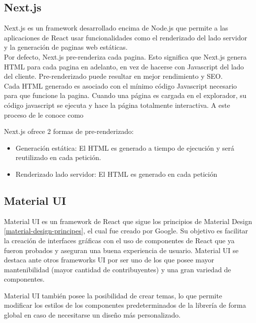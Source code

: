 \subsection{Next.js}

Next.js es un framework desarrollado encima de Node.js que permite a las aplicaciones de React usar funcionalidades como el renderizado del lado servidor y la generación de paginas web estáticas.\\

Por defecto, Next.js pre-renderiza cada pagina. Esto significa que Next.js genera HTML para cada pagina en adelanto, en vez de hacerse con Javascript del lado del cliente. Pre-renderizado puede resultar en mejor rendimiento y SEO.\\

Cada HTML generado es asociado con el mínimo código Javascript necesario para que funcione la pagina. Cuando una página es cargada en el explorador, su código javascript se ejecuta y hace la página totalmente interactiva. A este proceso de le conoce como 

Next.js ofrece 2 formas de pre-renderizado:

\begin{itemize}
    \item Generación estática: El HTML es generado a tiempo de ejecución y será reutilizado en cada petición.
    \item Renderizado lado servidor: El HTML es generado en cada petición
\end{itemize}

\subsection{Material UI}

Material UI es un framework de React que sigue los principios de Material Design \ref*{material-design-principes}, el cual fue creado por Google. Su objetivo es facilitar la creación de interfaces gráficas con el uso de componentes de React que ya fueron probados y aseguran una buena experiencia de usuario. Material UI se destaca ante otros frameworks UI por ser uno de los que posee mayor mantenibilidad (mayor cantidad de contribuyentes) y una gran variedad de componentes.

Material UI también posee la posibilidad de crear temas, lo que permite modificar los estilos de los componentes predeterminados de la librería de forma global en caso de necesitarse un diseño más personalizado.

